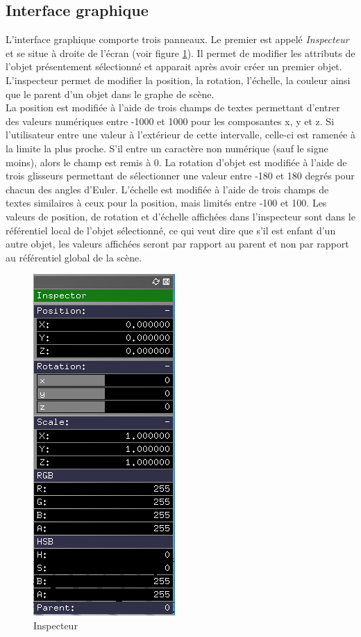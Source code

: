 \subsection{Interface graphique}
L'interface graphique comporte trois panneaux.
Le premier est appelé \emph{Inspecteur} et se situe à droite de l'écran (voir figure \ref{fig:inspecteur}).
Il permet de modifier les attributs de l'objet présentement sélectionné et apparait après avoir créer un premier objet.
L'inspecteur permet de modifier la position, la rotation, l'échelle, la couleur ainsi que le parent d'un objet dans le graphe de scène.\\

La position est modifiée à l'aide de trois champs de textes permettant d'entrer des valeurs numériques entre -1000 et 1000 pour les composantes x, y et z.
Si l'utilisateur entre une valeur à l'extérieur de cette intervalle, celle-ci est ramenée à la limite la plus proche.
S'il entre un caractère non numérique (sauf le signe moins), alors le champ est remis à 0.
La rotation d'objet est modifiée à l'aide de trois glisseurs permettant de sélectionner une valeur entre -180 et 180 degrés pour chacun des angles d'Euler.
L'échelle est modifiée à l'aide de trois champs de textes similaires à ceux pour la position, mais limités entre -100 et 100. Les valeurs de position, de rotation et d'échelle affichées dans l'inspecteur sont dans le référentiel local de l'objet sélectionné, ce qui veut dire que s'il est enfant d'un autre objet, les valeurs affichées seront par rapport au parent et non par rapport au référentiel global de la scène.\\


\begin{figure}[H]
    \centering
	\includegraphics[scale=0.6]{fig/inspecteur.png}
	\caption{Inspecteur}
	\label{fig:inspecteur}
\end{figure}

